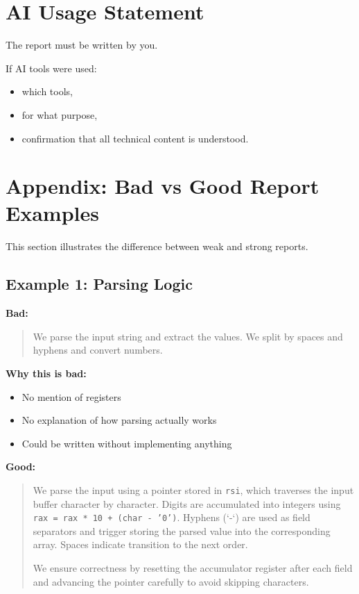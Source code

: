 \documentclass[a4paper,12pt]{article}
\begin{document}
\section*{AI Usage Statement}

The report must be written by you.

If AI tools were used:
\begin{itemize}
\item which tools,
\item for what purpose,
\item confirmation that all technical content is understood.
\end{itemize}

\newpage

\section*{Appendix: Bad vs Good Report Examples}

This section illustrates the difference between weak and strong reports.

\subsection*{Example 1: Parsing Logic}

\textbf{Bad:}
\begin{quote}
We parse the input string and extract the values. We split by spaces and hyphens and convert numbers.
\end{quote}

\textbf{Why this is bad:}
\begin{itemize}
\item No mention of registers
\item No explanation of how parsing actually works
\item Could be written without implementing anything
\end{itemize}

\textbf{Good:}
\begin{quote}
We parse the input using a pointer stored in \texttt{rsi}, which traverses the input buffer character by character. 
Digits are accumulated into integers using \texttt{rax = rax * 10 + (char - '0')}. 
Hyphens (`-`) are used as field separators and trigger storing the parsed value into the corresponding array. 
Spaces indicate transition to the next order. 

We ensure correctness by resetting the accumulator register after each field and advancing the pointer carefully to avoid skipping characters.
\end{quote}
\end{document}
